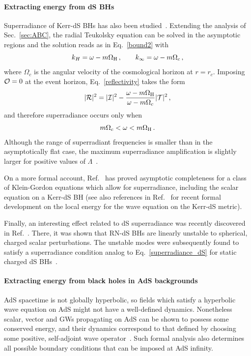 \documentclass[11pt]{article}
\numberwithin{equation}{section} %
\begin{document}
\paragraph{Extracting energy from dS BHs}
Superradiance of Kerr-dS BHs has also been studied~\cite{Tachizawa:1992ue}. Extending the analysis of Sec.~\ref{sec:ABC}, the radial Teukolsky equation can be solved in the asymptotic regions and the solution reads as in Eq.~\eqref{bound2} with
%
\begin{equation}
 k_H=\omega-m\Omega_{\rm H}\,,\qquad k_\infty =\omega-m\Omega_c\,,
\end{equation}
%
where $\Omega_c$ is the angular velocity of the cosmological horizon at $r=r_c$. Imposing ${\cal O}=0$ at the event horizon, Eq.~\eqref{reflectivity} takes the form
\begin{equation}
 |{\cal R}|^2=|{\cal I}|^2-\frac{\omega-m\Omega_{\rm H}}{\omega-m\Omega_c} |{\cal T}|^2 \,,\label{reflectivity_dS}
\end{equation}
and therefore superradiance occurs only when
\begin{equation}
 m\Omega_c<\omega<m \Omega_{\rm H}\,. \label{superradiance_dS}
\end{equation}
Although the range of superradiant frequencies is smaller than in the asymptotically flat case, the maximum superradiance amplification is slightly larger for positive values of $\Lambda$~\cite{Tachizawa:1992ue}.

On a more formal account, Ref.~\cite{Georgescu:2014yea} has proved asymptotic completeness for a class of Klein-Gordon equations which allow for superradiance, including the scalar equation on a Kerr-dS BH (see also references in Ref.~\cite{Georgescu:2014yea} for recent formal development on the local energy for the wave equation on the Kerr-dS metric). 


Finally, an interesting effect related to dS superradiance was recently discovered in Ref.~\cite{Zhu:2014sya}. There, it was shown that RN-dS BHs are linearly unstable to spherical, charged scalar perturbations. The unstable modes were subsequently found to satisfy a superradiance condition analog to Eq.~\eqref{superradiance_dS} for static charged dS BHs~\cite{Konoplya:2014lha}. 

\paragraph{Extracting energy from black holes in AdS backgrounds}
AdS spacetime is not globally hyperbolic, so fields which satisfy a hyperbolic wave equation on AdS might not have a 
well-defined dynamics. Nonetheless scalar, vector and GWs propagating on AdS can be shown to possess some conserved 
energy, and their dynamics correspond to that defined by choosing some positive, self-adjoint wave 
operator~\cite{Ishibashi:2004wx}. Such formal analysis also determines all possible boundary conditions that can be 
imposed at AdS infinity.
\end{document}
